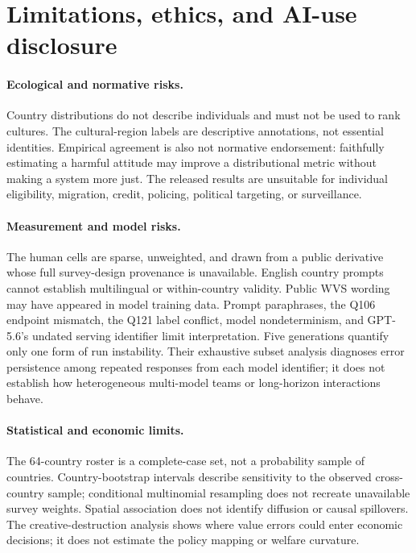 \section{Limitations, ethics, and AI-use disclosure}
\label{app:ethics}

\paragraph{Ecological and normative risks.}
Country distributions do not describe individuals and must not be used to rank cultures.
The cultural-region labels are descriptive annotations, not essential identities.
Empirical agreement is also not normative endorsement: faithfully estimating a harmful
attitude may improve a distributional metric without making a system more just. The
released results are unsuitable for individual eligibility, migration, credit, policing,
political targeting, or surveillance.

\paragraph{Measurement and model risks.}
The human cells are sparse, unweighted, and drawn from a public derivative whose full
survey-design provenance is unavailable. English country prompts cannot establish
multilingual or within-country validity. Public WVS wording may have appeared in model
training data. Prompt paraphrases, the Q106 endpoint mismatch, the Q121 label conflict,
model nondeterminism, and GPT-5.6's undated serving identifier limit interpretation.
Five generations quantify only one form of run instability. Their exhaustive subset
analysis diagnoses error persistence among repeated responses from each model identifier;
it does not establish how heterogeneous multi-model teams or long-horizon interactions
behave.

\paragraph{Statistical and economic limits.}
The 64-country roster is a complete-case set, not a probability sample of countries.
Country-bootstrap intervals describe sensitivity to the observed cross-country sample;
conditional multinomial resampling does not recreate unavailable survey weights.
Spatial association does not identify diffusion or causal spillovers. The
creative-destruction analysis shows where value errors could enter economic decisions;
it does not estimate the policy mapping or welfare curvature.

